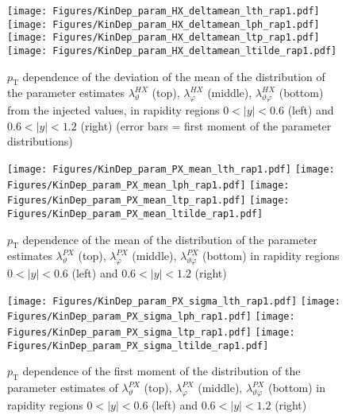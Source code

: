 \documentclass[12pt]{article}
\newcommand{\pT}{p_\mathrm{T}}
\newcommand{\absy}{\left |  y \right |}
\newcommand{\lamthHX}{\lambda^{\scriptscriptstyle HX}_\vartheta}
\newcommand{\lamphHX}{\lambda^{\scriptscriptstyle HX}_\varphi}
\newcommand{\lamthphHX}{\lambda^{\scriptscriptstyle HX}_{\vartheta \varphi}}
\newcommand{\lamthPX}{\lambda^{\scriptscriptstyle PX}_\vartheta}
\newcommand{\lamphPX}{\lambda^{\scriptscriptstyle PX}_\varphi}
\newcommand{\lamthphPX}{\lambda^{\scriptscriptstyle PX}_{\vartheta \varphi}}
\begin{document}




\begin{figure}[htbp]
\centering
\texttt{[image: Figures/KinDep\_param\_HX\_deltamean\_lth\_rap1.pdf]}
\texttt{[image: Figures/KinDep\_param\_HX\_deltamean\_lph\_rap1.pdf]}
\texttt{[image: Figures/KinDep\_param\_HX\_deltamean\_ltp\_rap1.pdf]}
\texttt{[image: Figures/KinDep\_param\_HX\_deltamean\_ltilde\_rap1.pdf]}
\caption{$\pT$ dependence of the deviation of the mean of the distribution of
the parameter estimates $\lamthHX$ (top), $\lamphHX$ (middle), $\lamthphHX$
(bottom) from the injected values, in rapidity regions $0<\absy<0.6$ (left) and
$0.6<\absy<1.2$ (right) (error bars = first moment of the parameter
distributions)}
\end{figure}
\clearpage












\begin{figure}[htbp]
\centering
\texttt{[image: Figures/KinDep\_param\_PX\_mean\_lth\_rap1.pdf]}
\texttt{[image: Figures/KinDep\_param\_PX\_mean\_lph\_rap1.pdf]}
\texttt{[image: Figures/KinDep\_param\_PX\_mean\_ltp\_rap1.pdf]}
\texttt{[image: Figures/KinDep\_param\_PX\_mean\_ltilde\_rap1.pdf]}
\caption{$\pT$ dependence of the mean of the distribution of the parameter estimates $\lamthPX$ (top), $\lamphPX$ (middle), $\lamthphPX$ (bottom) in rapidity regions $0<\absy<0.6$ (left) and $0.6<\absy<1.2$ (right)}
\end{figure}
\clearpage

\begin{figure}[htbp]
\centering
\texttt{[image: Figures/KinDep\_param\_PX\_sigma\_lth\_rap1.pdf]}
\texttt{[image: Figures/KinDep\_param\_PX\_sigma\_lph\_rap1.pdf]}
\texttt{[image: Figures/KinDep\_param\_PX\_sigma\_ltp\_rap1.pdf]}
\texttt{[image: Figures/KinDep\_param\_PX\_sigma\_ltilde\_rap1.pdf]}
\caption{$\pT$ dependence of the first moment of the distribution of the parameter estimates of $\lamthPX$ (top), $\lamphPX$ (middle), $\lamthphPX$ (bottom) in rapidity regions $0<\absy<0.6$ (left) and $0.6<\absy<1.2$ (right)}
\end{figure}
\clearpage
\end{document}
